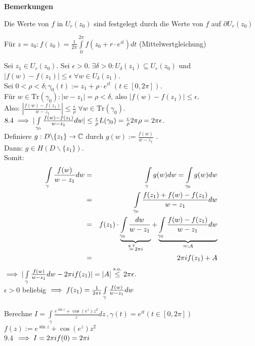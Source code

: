 \documentclass[a4paper,twoside,DIV15,BCOR12mm]{scrbook}
\def\Tr{\text{Tr}}
\def\wegint{\ensuremath{\int\limits_\gamma}}
\begin{document}
\textbf{Bemerkungen}
\begin{liste}
\item Die Werte von $f$ in $U_r(z_0)$ sind festgelegt durch die Werte von $f$ auf $\partial U_r(z_0)$
\item Für $z = z_0: f(z_0) = \frac{1}{2\pi}\int\limits _0^{2\pi}f(z_0 + r\cdot e^{it}) dt$ (Mittelwertgleichung)
\end{liste}

\begin{beweis}
Sei $z_1 \in U_r(z_0)$. Sei $\epsilon > 0.\; \exists \delta > 0: U_\delta (z_1) \subseteq U_r(z_0)$ und \\
$|f(w) - f(z_1)| \leq \epsilon\;\forall w\in U_\delta (z_1)$. \\
Sei $ 0<\rho <\delta ; \gamma _0(t) := z_1 + \rho\cdot e^{it}\; (t \in [0,2\pi])$.\\
Für $w \in\Tr (\gamma _0): |w - z_1| = \rho < \delta$, also $|f(w) - f(z_1)|\leq \epsilon$.\\
Also: $|\frac{f(w) - f(z_1)}{w -z_1}| \leq \frac{\epsilon}{\rho}\;\forall w\in\Tr (\gamma _0)$.\\
$8.4 \implies |\int\limits _{\gamma _0}\frac{f(w) - f(z_1)}{w -z_1} dw|\leq \frac{\epsilon}{\rho}L(\gamma _0) = \frac{\epsilon}{\rho} 2\pi\rho = 2\pi\epsilon$.\\
Definiere $g: D \backslash \{ z_1 \} \to \mathbb{C}$ durch $g(w) := \frac{f(w)}{w -z_1}$ .\\
Dann: $g \in H(D \backslash \{z_1 \})$.\\ Somit:
\begin{eqnarray}
\notag\wegint \frac{f(w)}{w - z_1} dw & = & \wegint g(w) dw = \int\limits_{\gamma _0} g(w) dw \\
\notag & = & \int\limits _{\gamma _0}\frac{f(z_1)+f(w)-f(z_1)}{w - z_1} dw\\
\notag & = & f(z_1) \cdot \underbrace{\int\limits _{\gamma _0}\frac{dw}{w - z_1}}_{\stackrel{8.7}{=}2\pi i} + \underbrace{\int\limits _{\gamma_0}\frac{f(w)-f(z_1)}{w - z_1} dw}_{=: A}\\
\notag & = & 2\pi if(z_1) + A
\end{eqnarray}
$\folgt |\wegint \frac{f(w)}{w - z_1} dw - 2\pi if(z_1)| = |A| \stackrel{\text{s.o.}}{\leq} 2\pi \epsilon$.\\
$\epsilon > 0$ beliebig $\folgt f(z_1) = \frac{1}{2\pi i}\wegint \frac{f(w)}{w - z_1} dw$
\end{beweis}

\begin{beispiel}
Berechne $I = \wegint \frac{e^{\sin z} + \cos(e^z)z^2}{z}dz\, , \gamma(t) = e^{it} (t \in [0,2\pi ])$\\
$f(z) := e^{\sin z } + \cos (e^z)z^2$\\
9.4 $\implies I = 2\pi if(0) = 2\pi i$
\end{beispiel}
\end{document}
